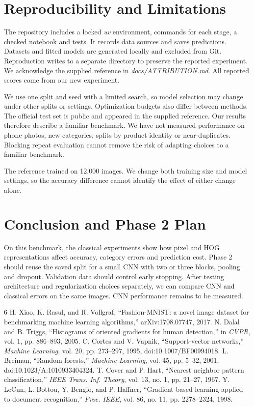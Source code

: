 \documentclass[conference]{IEEEtran}
\begin{document}
\section{Reproducibility and Limitations}
The repository includes a locked \textit{uv} environment, commands for each stage, a checked notebook and tests. It records data sources and saves predictions. Datasets and fitted models are generated locally and excluded from Git. Reproduction writes to a separate directory to preserve the reported experiment. We acknowledge the supplied reference in \textit{docs/ATTRIBUTION.md}. All reported scores come from our new experiment.

We use one split and seed with a limited search, so model selection may change under other splits or settings. Optimization budgets also differ between methods. The official test set is public and appeared in the supplied reference. Our results therefore describe a familiar benchmark. We have not measured performance on phone photos, new categories, splits by product identity or near-duplicates. Blocking repeat evaluation cannot remove the risk of adapting choices to a familiar benchmark.

The reference trained on 12,000 images. We change both training size and model settings, so the accuracy difference cannot identify the effect of either change alone.

\section{Conclusion and Phase 2 Plan}
On this benchmark, the classical experiments show how pixel and HOG representations affect accuracy, category errors and prediction cost. Phase 2 should reuse the saved split for a small CNN with two or three blocks, pooling and dropout. Validation data should control early stopping. After testing architecture and regularization choices separately, we can compare CNN and classical errors on the same images. CNN performance remains to be measured.

\begin{thebibliography}{6}
 H. Xiao, K. Rasul, and R. Vollgraf, ``Fashion-MNIST: a novel image dataset for benchmarking machine learning algorithms,'' arXiv:1708.07747, 2017.
 N. Dalal and B. Triggs, ``Histograms of oriented gradients for human detection,'' in \emph{CVPR}, vol. 1, pp. 886--893, 2005.
 C. Cortes and V. Vapnik, ``Support-vector networks,'' \emph{Machine Learning}, vol. 20, pp. 273--297, 1995, doi:10.1007/BF00994018.
 L. Breiman, ``Random forests,'' \emph{Machine Learning}, vol. 45, pp. 5--32, 2001, doi:10.1023/A:1010933404324.
 T. Cover and P. Hart, ``Nearest neighbor pattern classification,'' \emph{IEEE Trans. Inf. Theory}, vol. 13, no. 1, pp. 21--27, 1967.
 Y. LeCun, L. Bottou, Y. Bengio, and P. Haffner, ``Gradient-based learning applied to document recognition,'' \emph{Proc. IEEE}, vol. 86, no. 11, pp. 2278--2324, 1998.
\end{thebibliography}
\end{document}

